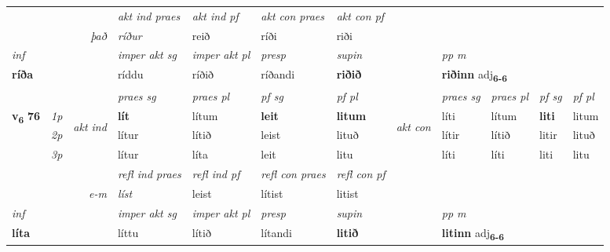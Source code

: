 \begin{longtable}[l]{X>{\footnotesize\itshape}llXXXXlXXXX}
   && &  \textit{akt ind praes} & \textit{akt ind pf} & \textit{akt con praes} & \textit{akt con pf} \\*
\multicolumn{3}{r}{\textit{það}} & ríður & reið & ríði & riði \\*

\cmidrule{4-7}
   {\textit{inf}} & &  & \textit{imper akt sg} & \textit{imper akt pl}   & \textit{presp} & \textit{supin}  && \textit{pp m} \\*
  {\textbf{ríða}} & && ríddu  & ríðið   & ríðandi &  \textbf{riðið}  && \multicolumn{2}{l}{\textbf{riðinn} adj\textbf{\textsubscript{6-6}}} \\*

\midrule

 & &   & \textit{praes sg}  & \textit{praes pl}    & \textit{ pf sg} & \textit{pf pl} & & \textit{praes sg}  & \textit{praes pl}    & \textit{pf sg} & \textit{pf pl }  \\ \cmidrule{4-7} \cmidrule{9-12}
 \multirow{2}{*}{{{\textbf{v{\textsubscript{6}}} \Large{\textbf{76}}}}}  & 1p & \multirow{3}{*}{\begin{turn}{90}\textit{akt ind}\end{turn}} & \textbf{lít} & lítum & \textbf{leit} & \textbf{litum} & \multirow{3}{*}{\begin{turn}{90}\textit{akt con}\end{turn}} &líti & lítum & \textbf{liti} & litum\\*
 & 2p &  &  lítur  & lítið & leist & lituð & & lítir & lítið & litir & lituð \\*
 & 3p &  & lítur & líta & leit & litu & & líti & líti& liti & litu \\*
\cmidrule{4-7} \cmidrule{9-12}

 & && \textit{refl ind praes} & \textit{refl ind pf} & \textit{refl con praes} & \textit{refl con pf} \\*
\multicolumn{3}{r}{\textit{e-m}}& líst & leist & lítist & litist \\*

\cmidrule{4-7}
   {\textit{inf}} & &  & \textit{imper akt sg} & \textit{imper akt pl}   & \textit{presp} & \textit{supin}  && \textit{pp m} \\*
  {\textbf{líta}} & && líttu  & lítið   & lítandi &  \textbf{litið}  && \multicolumn{2}{l}{\textbf{litinn} adj\textbf{\textsubscript{6-6}}} \\*

\midrule


\end{longtable}
